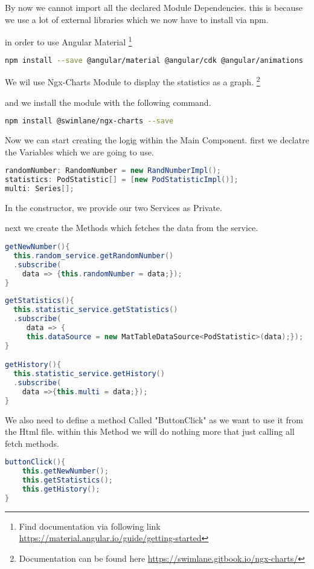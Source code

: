 By now we cannot import all the declared Module Dependencies. this is because we use a lot of external libraries which we now have to install via npm.

in order to use Angular Material \footnote{Find documentation via following link \url{https://material.angular.io/guide/getting-started}}
\begin{lstlisting}[language=Bash]
npm install --save @angular/material @angular/cdk @angular/animations 
\end{lstlisting}


We wil use Ngx-Charts Module to display the statistics as a graph.
\footnote{Documentation can be found here \url{https://swimlane.gitbook.io/ngx-charts/}}

and we install the module with the following command.
\begin{lstlisting}[language=Bash]
npm install @swimlane/ngx-charts --save
\end{lstlisting}

Now we can start creating the logig within the Main Component.
first we declatre the Variables which we are going to use.
\begin{lstlisting}[language=Java]
randomNumber: RandomNumber = new RandNumberImpl();
statistics: PodStatistic[] = [new PodStatisticImpl()];
multi: Series[];
\end{lstlisting}

In the constructor, we provide our two Services as Private.

next we create the Methods which fetches the data from the service.
\begin{lstlisting}[language=Java]
getNewNumber(){
  this.random_service.getRandomNumber()
  .subscribe(
    data => {this.randomNumber = data;});
}
  
getStatistics(){
  this.statistic_service.getStatistics()
  .subscribe(
     data => {
     this.dataSource = new MatTableDataSource<PodStatistic>(data);});
}

getHistory(){
  this.statistic_service.getHistory()
  .subscribe(
    data =>{this.multi = data;});
}
\end{lstlisting}

We also need to define a method Called "ButtonClick" as we want to use it from the Html file. within this Method we will do nothing more that just calling all fetch methods.
\begin{lstlisting}[language=Java]
buttonClick(){
    this.getNewNumber();
    this.getStatistics();
    this.getHistory();
}
\end{lstlisting}

